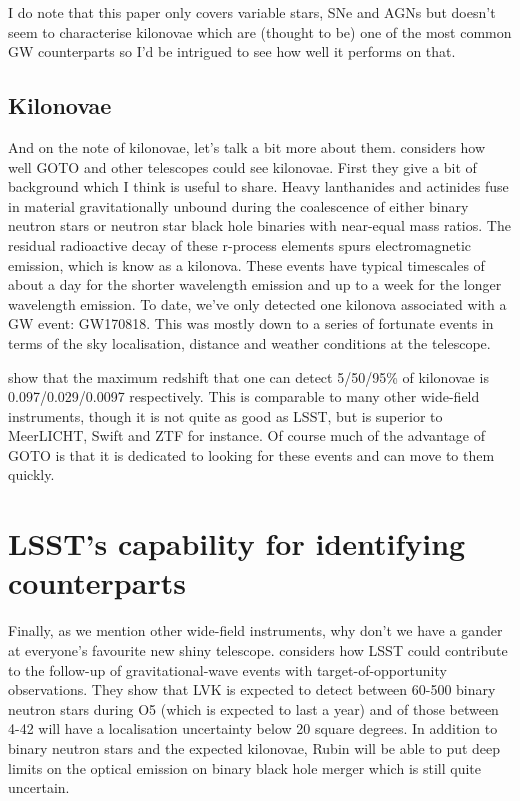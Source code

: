 \documentclass[twocolumn]{aastex631}
\begin{document}
I do note that this paper only covers variable stars, SNe and AGNs but doesn't seem to characterise kilonovae which are (thought to be) one of the most common GW counterparts so I'd be intrigued to see how well it performs on that.

\subsection{Kilonovae}
And on the note of kilonovae, let's talk a bit more about them. \citet{Chase+2022} considers how well GOTO and other telescopes could see kilonovae. First they give a bit of background which I think is useful to share. Heavy lanthanides and actinides fuse in material gravitationally unbound during the coalescence of either binary neutron stars or neutron star black hole binaries with near-equal mass ratios. The residual radioactive decay of these r-process elements spurs electromagnetic emission, which is know as a kilonova. These events have typical timescales of about a day for the shorter wavelength emission and up to a week for the longer wavelength emission. To date, we've only detected one kilonova associated with a GW event: GW170818. This was mostly down to a series of fortunate events in terms of the sky localisation, distance and weather conditions at the telescope.

\citet{Chase+2022} show that the maximum redshift that one can detect 5/50/95\% of kilonovae is 0.097/0.029/0.0097 respectively. This is comparable to many other wide-field instruments, though it is not quite as good as LSST, but is superior to MeerLICHT, Swift and ZTF for instance. Of course much of the advantage of GOTO is that it is dedicated to looking for these events and can move to them quickly.
 
\section{LSST's capability for identifying counterparts}
Finally, as we mention other wide-field instruments, why don't we have a gander at everyone's favourite new shiny telescope. \citet{Andreoni+2022} considers how LSST could contribute to the follow-up of gravitational-wave events with target-of-opportunity observations. They show that LVK is expected to detect between 60-500 binary neutron stars during O5 (which is expected to last a year) and of those between 4-42 will have a localisation uncertainty below 20 square degrees. In addition to binary neutron stars and the expected kilonovae, Rubin will be able to put deep limits on the optical emission on binary black hole merger which is still quite uncertain.
\end{document}
